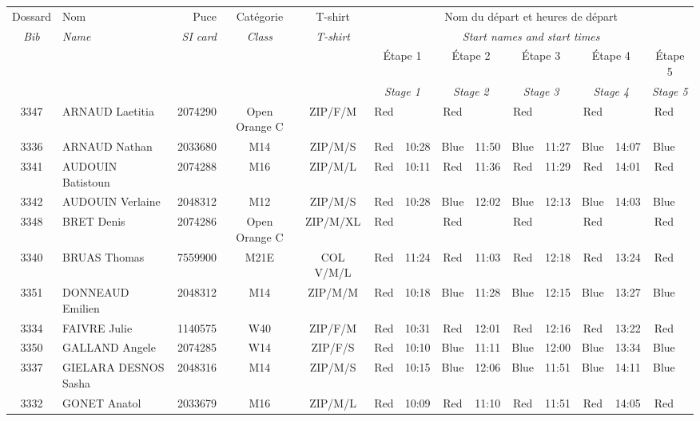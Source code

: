 \documentclass{report}
\begin{document}
  \begin{longtable}{|c|l|r|c|c|*{5}{cc|}}
    Dossard & Nom  & Puce    & Catégorie & T-shirt & \multicolumn{10}{c|}{Nom du départ et heures de départ} \\
    \itshape Bib     & \itshape Name & \itshape SI card & \itshape Class  & \itshape  T-shirt  & \multicolumn{10}{c|}{\itshape Start names and start times} \\
    \hline
    & & & & & \multicolumn{2}{c|}{Étape 1} & \multicolumn{2}{c|}{Étape 2} & \multicolumn{2}{c|}{Étape 3} & \multicolumn{2}{c|}{Étape 4} & \multicolumn{2}{c|}{Étape 5} \\
    & & & & & \multicolumn{2}{c|}{\itshape Stage 1} & \multicolumn{2}{c|}{\itshape Stage 2} & \multicolumn{2}{c|}{\itshape Stage 3} & \multicolumn{2}{c|}{\itshape Stage 4} & \multicolumn{2}{c|}{\itshape Stage 5} \\
    \hline
    3347 & ARNAUD Laetitia & 2074290 & Open Orange C & ZIP/F/M & Red &   & Red &   & Red &   & Red &   & Red &  \\
    3336 & ARNAUD Nathan & 2033680 & M14 & ZIP/M/S & Red & 10:28 & Blue & 11:50 & Blue & 11:27 & Blue & 14:07 & Blue &  \\
    3341 & AUDOUIN Batistoun & 2074288 & M16 & ZIP/M/L & Red & 10:11 & Red & 11:36 & Red & 11:29 & Red & 14:01 & Red &  \\
    3342 & AUDOUIN Verlaine & 2048312 & M12 & ZIP/M/S & Red & 10:28 & Blue & 12:02 & Blue & 12:13 & Blue & 14:03 & Blue &  \\
    3348 & BRET Denis & 2074286 & Open Orange C & ZIP/M/XL & Red &   & Red &   & Red &   & Red &   & Red &  \\
    3340 & BRUAS Thomas & 7559900 & M21E & COL V/M/L & Red & 11:24 & Red & 11:03 & Red & 12:18 & Red & 13:24 & Red &  \\
    3351 & DONNEAUD Emilien & 2048312 & M14 & ZIP/M/M & Red & 10:18 & Blue & 11:28 & Blue & 12:15 & Blue & 13:27 & Blue &  \\
    3334 & FAIVRE Julie & 1140575 & W40 & ZIP/F/M & Red & 10:31 & Red & 12:01 & Red & 12:16 & Red & 13:22 & Red &  \\
    3350 & GALLAND Angele & 2074285 & W14 & ZIP/F/S & Red & 10:10 & Blue & 11:11 & Blue & 12:00 & Blue & 13:34 & Blue &  \\
    3337 & GIELARA DESNOS Sasha & 2048316 & M14 & ZIP/M/S & Red & 10:15 & Blue & 12:06 & Blue & 11:51 & Blue & 14:11 & Blue &  \\
    3332 & GONET Anatol & 2033679 & M16 & ZIP/M/L & Red & 10:09 & Red & 11:10 & Red & 11:51 & Red & 14:05 & Red &  \\

\end{longtable}
\end{document}
